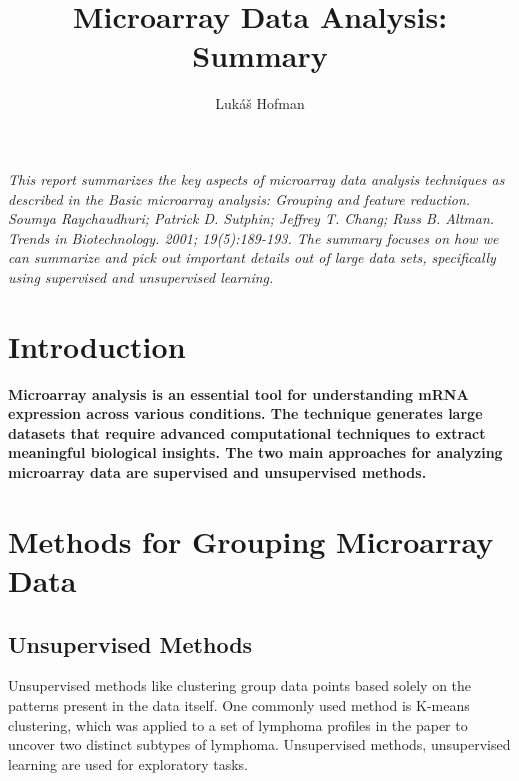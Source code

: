 \documentclass{llncs}
\begin{document}
\title{Microarray Data Analysis: Summary}

\author{Lukáš Hofman}

\maketitle 

\vspace{1cm} %

\textit{This report summarizes the key aspects of microarray data
analysis techniques as described in the Basic microarray analysis: Grouping and feature
reduction. Soumya Raychaudhuri; Patrick D. Sutphin;
Jeffrey T. Chang; Russ B. Altman. Trends in Biotechnology.
2001; 19(5):189-193. The summary focuses on how we can summarize and pick out
important details out of large data sets, specifically using supervised and unsupervised learning.}


\section{Introduction}

\textbf{Microarray analysis is an essential tool for understanding mRNA expression
across various conditions. The technique generates large datasets that require
advanced computational techniques to extract meaningful biological insights.
The two main approaches for analyzing microarray data are supervised and unsupervised 
methods.}


\section{Methods for Grouping Microarray Data}

\subsection{Unsupervised Methods}

Unsupervised methods like clustering group data points based solely on the
patterns present in the data itself. One commonly used method is K-means
clustering, which was applied to a set of lymphoma profiles in the paper to
uncover two distinct subtypes of lymphoma.
Unsupervised methods, unsupervised learning are used for exploratory tasks.
\end{document}

